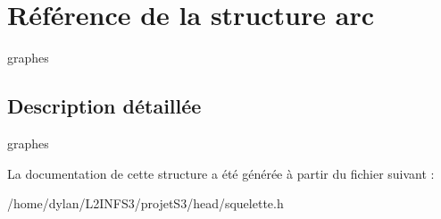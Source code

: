 \hypertarget{structarc}{}\section{Référence de la structure arc}
\label{structarc}


graphes  




\subsection{Description détaillée}
graphes 

La documentation de cette structure a été générée à partir du fichier suivant \+:\begin{DoxyCompactItemize}
\item 
/home/dylan/\+L2\+I\+N\+F\+S3/projet\+S3/head/squelette.\+h\end{DoxyCompactItemize}
